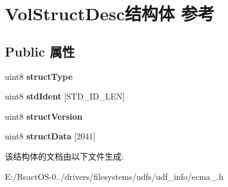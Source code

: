 \hypertarget{struct_vol_struct_desc}{}\section{Vol\+Struct\+Desc结构体 参考}
\label{struct_vol_struct_desc}
\subsection*{Public 属性}
\begin{DoxyCompactItemize}
\item 
\mbox{\label{struct_vol_struct_desc_a5654620da75e0a6259a19c2c8a7b2cfa}} 
uint8 {\bfseries struct\+Type}
\item 
\mbox{\label{struct_vol_struct_desc_ac0ab33ef58cf52002e4ff5dd96c529fd}} 
uint8 {\bfseries std\+Ident} \mbox{[}S\+T\+D\+\_\+\+I\+D\+\_\+\+L\+EN\mbox{]}
\item 
\mbox{\label{struct_vol_struct_desc_a7d3d525c20f8a316eda17091e196f56c}} 
uint8 {\bfseries struct\+Version}
\item 
\mbox{\label{struct_vol_struct_desc_ac981938ffd75e0ceaa569f5d981cddc2}} 
uint8 {\bfseries struct\+Data} \mbox{[}2041\mbox{]}
\end{DoxyCompactItemize}


该结构体的文档由以下文件生成\+:\begin{DoxyCompactItemize}
\item 
E\+:/\+React\+O\+S-\/0../drivers/filesystems/udfs/udf\+\_\+info/ecma\+\_.\+h\end{DoxyCompactItemize}
